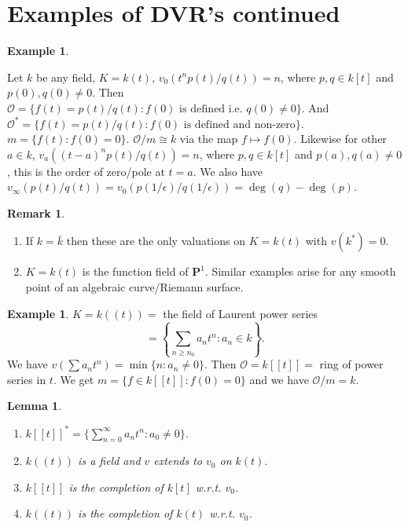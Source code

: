 \documentclass[10pt,]{book}
\theoremstyle{plain}
\newtheorem{lemma}[theorem]{Lemma}
\theoremstyle{definition}
\newtheorem{example}[theorem]{Example}
\newtheorem{remark}[theorem]{Remark}
\newcommand{\PP}{\mathbf{P}}
\newcommand{\cO}{\mathcal{O}}
\begin{document}
\section[Examples of DVR's continued]{Examples of DVR's continued}\label{sec-dvrs}
\begin{example}\label{example-5}

            Let \(k\) be any field, \(K = k(t)\), \(v_0(t^n p(t)/q(t)) = n\), where \(p,q\in k[t]\) and \(p(0),q(0) \ne 0\).
            Then \(\cO = \{f(t) = p(t)/q(t) : f(0)\text{ is defined i.e. } q(0) \ne 0\}\).
            And \(\cO^* = \{f(t) = p(t)/q(t) : f(0)\text{ is defined and non-zero}\}\).
            \(m = \{f(t) : f(0) = 0\}\).
            \(\cO/m \cong k\) via the map \(f\mapsto f(0)\).
            Likewise for other \(a \in k\), \(v_a((t-a)^n p(t)/q(t)) = n\), where \(p,q\in k[t]\) and \(p(a),q(a) \ne 0\), this is the order of zero/pole at \(t = a\).
            We also have \(v_\infty(p(t) / q(t)) = v_0 (p (1/\epsilon)/q(1/\epsilon)) = \deg (q) - \deg (p)\).
          \end{example}
\begin{remark}\label{remark-8}
\begin{enumerate}
\item{}
                If \(k = \bar k\) then these are the only valuations on \(K = k(t)\) with \(v (k^* ) = 0\).
              \item{}
                \(K = k(t)\) is the function field of \(\PP^1\).
                Similar examples arise for any smooth point of an algebraic curve/Riemann surface.
              \end{enumerate}
\end{remark}
\begin{example}\label{example-6}
\(K = k((t)) = \) the field of Laurent power series \[ = \left\{ \sum_{n \ge n_0} a_n t^n : a_n \in k\right\}.\]
            We have \(v ( \sum a_n t^n ) = \min \{n : a_n  \ne 0\}\).
            Then \(\cO = k[[t]] =\) ring of power series in \(t\).
            We get \(m = \{ f \in k[[t]]: f(0) = 0\}\) and we have \(\cO/m = k\).
          \end{example}
\begin{lemma}\label{lemma-11}
\begin{enumerate}
\item{}\(k[[t]]^* = \{\sum _{n=0}^\infty a_n t^n : a_0 \ne 0\}\).\item{}\(k((t))\) is a field and \(v\) extends to \(v_0\) on \(k(t)\).\item{}\(k[[t]]\) is the completion of \(k[t]\) w.r.t. \(v_0\).\item{}\(k((t))\) is the completion of \(k(t)\) w.r.t. \(v_0\).\end{enumerate}
\end{lemma}
\end{document}
